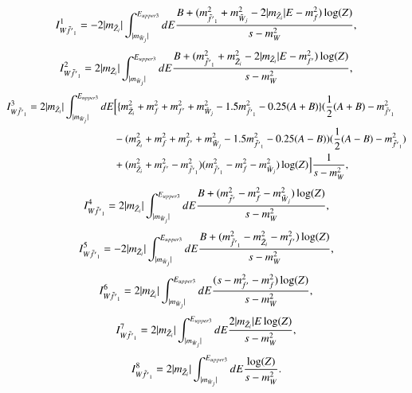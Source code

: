 \documentclass[final,3p,times,pdflatex]{elsarticle}
\begin{document}
\begin{equation}
I_{W \tilde{f'}_1}^{1} = -2|m_{\tilde{Z}_i}| \int_{|m_{\tilde{W}_j}|}^{E_{upper3}} dE {B + (m_{\tilde{f'}_1}^2 + m_{\tilde{W}_j}^2 - 2|m_{\tilde{Z}_i}|E - m_{f}^2)\log(Z) \over s-m_{W}^2} ,
\end{equation}
\begin{equation}
I_{W \tilde{f'}_1}^{2} = 2|m_{\tilde{Z}_i}| \int_{|m_{\tilde{W}_j}|}^{E_{upper3}} dE {B + (m_{\tilde{f'}_1}^2 + m_{\tilde{Z}_i}^2 - 2|m_{\tilde{Z}_i}|E - m_{f'}^2)\log(Z) \over s - m_{W}^2},
\end{equation}
\begin{equation}
\begin{aligned}
I_{W \tilde{f'}_1}^{3} = 2|m_{\tilde{Z}_i}| \int_{|m_{\tilde{W}_j}|}^{E_{upper3}} dE & \Big[\{m_{\tilde{Z}_i}^2 + m_{f}^2 + m_{f'}^2 + m_{\tilde{W}_j}^2 - 1.5 m_{\tilde{f'}_1}^2 - 0.25(A+B)\}(\frac{1}{2}(A+B) - m_{\tilde{f'}_1}^2 \\ & - (m_{\tilde{Z}_i}^2 + m_{f}^2 + m_{f'}^2 +m_{\tilde{W}_j}^2 - 1.5m_{\tilde{f'}_1}^2 - 0.25(A-B))(\frac{1}{2}(A-B) - m_{\tilde{f'}_1}^2) \\ & + (m_{\tilde{Z}_i}^2 + m_{f'}^2 - m_{\tilde{f'}_1}^2)(m_{\tilde{f'}_1}^2-m_{f}^2 - m_{\tilde{W}_j}^2)\log(Z)\Big]{1 \over s - m_{W}^2},
\end{aligned}
\end{equation}
\begin{equation}
I_{W \tilde{f'}_1}^{4} = 2|m_{\tilde{Z}_i}| \int_{|m_{\tilde{W}_j}|}^{E_{upper3}} dE {B + (m_{\tilde{f'}}^2 - m_{f}^2 - m_{\tilde{W}_j}^2)\log(Z) \over s - m_{W}^2},
\end{equation}
\begin{equation}
I_{W \tilde{f'}_1}^{5} = -2|m_{\tilde{Z}_i}| \int_{|m_{\tilde{W}_j}|}^{E_{upper3}} dE {B + (m_{\tilde{f'}_1}^2 - m_{\tilde{Z}_i}^2 - m_{f'}^2)\log(Z) \over s - m_{W}^2},
\end{equation}
\begin{equation}
I_{W \tilde{f'}_1}^{6} = 2|m_{\tilde{Z}_i}| \int_{|m_{\tilde{W}_j}|}^{E_{upper3}} dE {(s-m_{f'}^2 - m_{f}^2)\log(Z) \over s- m_{W}^2},
\end{equation}
\begin{equation}
I_{W \tilde{f'}_1}^{7} = 2|m_{\tilde{Z}_i}| \int_{|m_{\tilde{W}_j}|}^{E_{upper3}} dE {2|m_{\tilde{Z}_i}|E \log(Z) \over s-m_{W}^2},
\end{equation}
\begin{equation}
I_{W \tilde{f'}_1}^{8} = 2|m_{\tilde{Z}_i}| \int_{|m_{\tilde{W}_j}|}^{E_{upper3}} dE {\log(Z) \over s-m_{W}^2}.
\end{equation}
\end{document}
